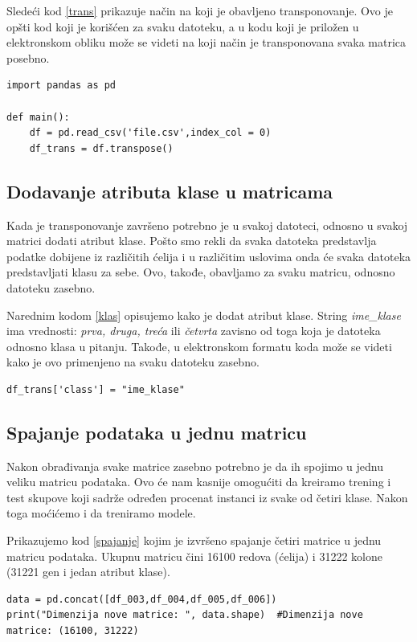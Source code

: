 \documentclass[a4paper]{article}
\begin{document}
Sledeći kod \ref{trans} prikazuje način na koji je obavljeno transponovanje. Ovo je opšti kod koji je korišćen za svaku datoteku, a u kodu koji je priložen u elektronskom obliku može se videti na koji način je transponovana svaka matrica posebno. 
\\
\begin{lstlisting}[caption={Opšti postupak transponovanja matrica},frame=single, label=trans]
import pandas as pd

def main():
	df = pd.read_csv('file.csv',index_col = 0)
	df_trans = df.transpose()
\end{lstlisting}

\subsection{Dodavanje atributa klase u matricama}
Kada je transponovanje završeno potrebno je u svakoj datoteci, odnosno u svakoj matrici dodati atribut klase. Pošto smo rekli da svaka datoteka predstavlja podatke dobijene iz različitih ćelija i u različitim uslovima onda će svaka datoteka predstavljati klasu za sebe. Ovo, takođe, obavljamo za svaku matricu, odnosno datoteku zasebno.

Narednim kodom \ref{klas} opisujemo kako je dodat atribut klase. String {\em ime\_klase } ima vrednosti: {\em prva, druga, treća} ili {\em četvrta} zavisno od toga koja je datoteka odnosno klasa u pitanju. Takođe, u elektronskom formatu koda može se videti kako je ovo primenjeno na svaku datoteku zasebno.
\\

\begin{lstlisting}[caption={Opšti postupak dodavanja atributa 'class'},frame=single, label=klas]
df_trans['class'] = "ime_klase"
\end{lstlisting}

\subsection{Spajanje podataka u jednu matricu}

Nakon obrađivanja svake matrice zasebno potrebno je da ih spojimo u jednu veliku matricu podataka. Ovo će nam kasnije omogućiti da kreiramo trening i test skupove koji sadrže određen procenat instanci iz svake od četiri klase. Nakon toga moćićemo i da treniramo modele. 

Prikazujemo kod \ref{spajanje} kojim je izvršeno spajanje četiri matrice u jednu matricu podataka. Ukupnu matricu čini 16100 redova (ćelija) i 31222 kolone (31221 gen i jedan atribut klase).
\\
\begin{lstlisting}[caption={Spajanje podataka u jednu matricu},frame=single, label=spajanje]
data = pd.concat([df_003,df_004,df_005,df_006])
print("Dimenzija nove matrice: ", data.shape)  #Dimenzija nove matrice: (16100, 31222)
\end{lstlisting}
\end{document}
